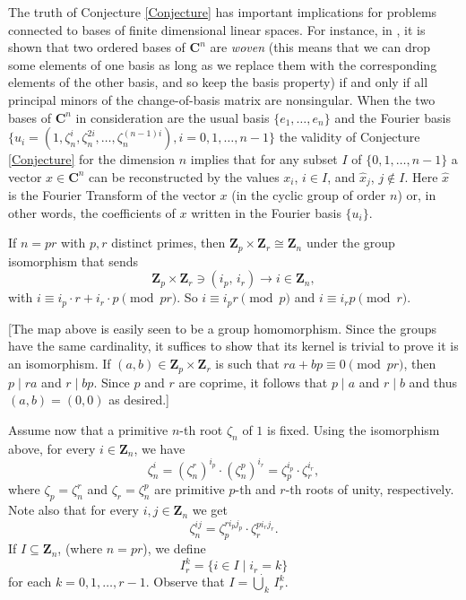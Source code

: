 \documentclass[10pt,a4paper]{amsart}
\def\Z{\mathbf{Z}}
\begin{document}
The truth of Conjecture \ref{Conjecture} has important implications for problems connected to bases of finite dimensional linear spaces. For instance, in \cite{Cabreli}, it is shown that two ordered bases of $\mathbf{C}^n$ are \textit{woven} (this means that we can drop some elements of one basis as long as we replace them with the corresponding elements of the other basis, and so keep the basis property) if and only if all principal minors of the change-of-basis matrix are nonsingular. When the two bases of $\mathbf{C}^n$ in consideration are the usual basis $\{e_1, \ldots, e_n\}$ and the Fourier basis $\{u_i = (1, \zeta_n^i, \zeta_n^{2i}, \ldots, \zeta_n^{(n-1)i}), i=0, 1, \ldots, n-1\}$ the validity of Conjecture \ref{Conjecture} for the dimension $n$ implies that for any subset $I$ of $\{0, 1, \ldots, n-1\}$ a vector $x \in \mathbf{C}^n$ can be reconstructed by the values $x_i$, $i \in I$, and $\widehat{x}_j$, $j \notin I$. Here $\widehat{x}$ is the Fourier Transform of the vector $x$ (in the cyclic group of order $n$) or, in other words, the coefficients of $x$ written in the Fourier basis $\{u_i\}$.



If $n=p r$  with $p,r$ distinct primes,     then $\Z_p \times \Z_r \cong \Z_n$ under the group  isomorphism that sends 
\begin{equation}\label{eq:isomo}
   \Z_p \times \Z_r \ni (i_p, \, i_r) \longrightarrow   i \in   \Z_n,
\end{equation}
 with   $i \equiv i_p \cdot r +i_r \cdot p  \pmod{ pr}$.  So $i \equiv i_p r \pmod p$ and $i \equiv i_r p \pmod r$. 
 
  [The map above  is easily seen to be a group homomorphism. Since the groups have the same cardinality, it suffices to show that its kernel is trivial to prove it is an isomorphism. If $(a, b) \in \Z_p \times \Z_r$ is such that $ra + bp \equiv 0 \pmod{pr}$, then $p \mid ra$ and $r \mid bp$. Since $p$ and $r$ are coprime, it follows that $p \mid a$ and $r \mid b$ and thus $(a,b) = (0,0)$ as desired.]

Assume now that a primitive $n$-th root $\zeta_n$ of $1$ is fixed. Using the isomorphism above, for every $i \in \Z_n$,  we have 
\begin{equation}\label{eq:zn^i}
\zeta_n^i = (\zeta_n^r)^{i_p} \cdot (\zeta_n^p)^{i_r}= \zeta_p^{i_p} \cdot \zeta_r^{i_r}, 
\end{equation}
where $\zeta_p = \zeta_n^r$  and $\zeta_r = \zeta_n^p$ are  primitive $p$-th and $r$-th roots of unity, respectively.
Note also that for every $i, j \in \Z_n$  we  get  
\[
\zeta_n^{ij}= \zeta_p^{ri_pj_p} \cdot \zeta_r^{pi_rj_r}.
\]
If $I \subseteq \Z_n$, (where $n = pr$), we define
\begin{equation}\label{eq:def}
I_r^k = \{ i \in I \mid i_r = k  \}
\end{equation}
for each $k = 0, 1, \ldots, r-1$. 
 Observe that $I = \dot\bigcup_{k}\,  I_r^k$. 
 
\end{document}
